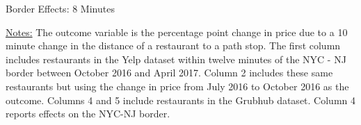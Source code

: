 \documentclass[11pt]{article}
\begin{document}
\begin{table}[H]
\centering
\caption{Border Effects: 8 Minutes}

{\footnotesize \raggedright \underline{Notes:} 
The outcome variable is the percentage point change in price due to a 10 minute change in the distance of a restaurant to a path stop. The first column includes restaurants in the Yelp dataset within twelve minutes of the NYC - NJ border between October 2016 and April 2017. Column 2 includes these same restaurants but using the change in price from July 2016 to October 2016 as the outcome. Columns 4 and 5 include restaurants in the Grubhub dataset. Column 4 reports effects on the NYC-NJ border.  \par
}
\end{table}
\end{document}
